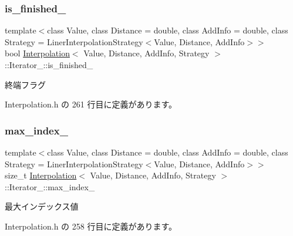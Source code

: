\subsubsection{\texorpdfstring{is\+\_\+finished\+\_\+}{is\_finished\_}}
{\footnotesize\ttfamily template$<$class Value, class Distance = double, class Add\+Info = double, class Strategy = Liner\+Interpolation\+Strategy$<$\+Value, Distance, Add\+Info$>$$>$ \\
bool \mbox{\hyperlink{class_interpolation}{Interpolation}}$<$ Value, Distance, Add\+Info, Strategy $>$\+::Iterator\+\_\+\+::is\+\_\+finished\+\_\+\hspace{0.3cm}{\ttfamily [private]}}



終端フラグ 



 Interpolation.\+h の 261 行目に定義があります。

\mbox{\label{class_interpolation_1_1_iterator___adecbf93696c431a25a2d8cd4f094ef33}} 
\subsubsection{\texorpdfstring{max\+\_\+index\+\_\+}{max\_index\_}}
{\footnotesize\ttfamily template$<$class Value, class Distance = double, class Add\+Info = double, class Strategy = Liner\+Interpolation\+Strategy$<$\+Value, Distance, Add\+Info$>$$>$ \\
size\+\_\+t \mbox{\hyperlink{class_interpolation}{Interpolation}}$<$ Value, Distance, Add\+Info, Strategy $>$\+::Iterator\+\_\+\+::max\+\_\+index\+\_\+\hspace{0.3cm}{\ttfamily [private]}}



最大インデックス値 



 Interpolation.\+h の 258 行目に定義があります。

\mbox{\label{class_interpolation_1_1_iterator___abdbf4ab755008781e80bbc5ec2405d83}} 
